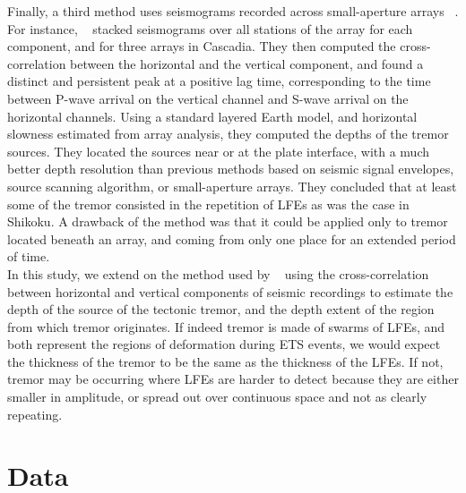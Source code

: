 \documentclass[draft]{agujournal2019}
\begin{document}
Finally, a third method uses seismograms recorded across small-aperture arrays ~\cite{GHO_2010_GRL, LAR_2009}. For instance, ~ stacked seismograms over all stations of the array for each component, and for three arrays in Cascadia. They then computed the cross-correlation between the horizontal and the vertical component, and found a distinct and persistent peak at a positive lag time, corresponding to the time between P-wave arrival on the vertical channel and S-wave arrival on the horizontal channels. Using a standard layered Earth model, and horizontal slowness estimated from array analysis, they computed the depths of the tremor sources. They located the sources near or at the plate interface, with a much better depth resolution than previous methods based on seismic signal envelopes, source scanning algorithm, or small-aperture arrays. They concluded that at least some of the tremor consisted in the repetition of LFEs as was the case in Shikoku. A drawback of the method was that it could be applied only to tremor located beneath an array, and coming from only one place for an extended period of time. \\

In this study, we extend on the method used by ~ using the cross-correlation between horizontal and vertical components of seismic recordings to estimate the depth of the source of the tectonic tremor, and the depth extent of the region from which tremor originates. If indeed tremor is made of swarms of LFEs, and both represent the regions of deformation during ETS events, we would expect the thickness of the tremor to be the same as the thickness of the LFEs. If not, tremor may be occurring where LFEs are harder to detect because they are either smaller in amplitude, or spread out over continuous space and not as clearly repeating.

\section{Data}
\end{document}
